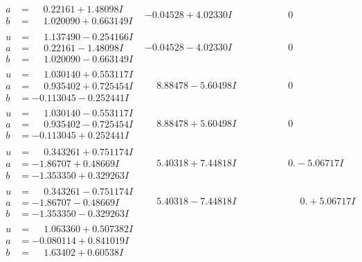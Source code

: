 \documentclass[1p]{elsarticle_modified}
\theoremstyle{definition}
\begin{document}
$$\begin{array}{c|c|c}
\begin{aligned}
a &= \phantom{-}0.22161 + 1.48098 I \\
b &= \phantom{-}1.020090 + 0.663149 I\end{aligned}
 & -0.04528 + 4.02330 I & \phantom{-0.000000 } 0 \\ \hline\begin{aligned}
u &= \phantom{-}1.137490 - 0.254166 I \\
a &= \phantom{-}0.22161 - 1.48098 I \\
b &= \phantom{-}1.020090 - 0.663149 I\end{aligned}
 & -0.04528 - 4.02330 I & \phantom{-0.000000 } 0 \\ \hline\begin{aligned}
u &= \phantom{-}1.030140 + 0.553117 I \\
a &= \phantom{-}0.935402 + 0.725454 I \\
b &= -0.113045 - 0.252441 I\end{aligned}
 & \phantom{-}8.88478 - 5.60498 I & \phantom{-0.000000 } 0 \\ \hline\begin{aligned}
u &= \phantom{-}1.030140 - 0.553117 I \\
a &= \phantom{-}0.935402 - 0.725454 I \\
b &= -0.113045 + 0.252441 I\end{aligned}
 & \phantom{-}8.88478 + 5.60498 I & \phantom{-0.000000 } 0 \\ \hline\begin{aligned}
u &= \phantom{-}0.343261 + 0.751174 I \\
a &= -1.86707 + 0.48669 I \\
b &= -1.353350 + 0.329263 I\end{aligned}
 & \phantom{-}5.40318 + 7.44818 I & \phantom{-0.000000 } 0. - 5.06717 I \\ \hline\begin{aligned}
u &= \phantom{-}0.343261 - 0.751174 I \\
a &= -1.86707 - 0.48669 I \\
b &= -1.353350 - 0.329263 I\end{aligned}
 & \phantom{-}5.40318 - 7.44818 I & \phantom{-0.000000 -}0. + 5.06717 I \\ \hline\begin{aligned}
u &= \phantom{-}1.063360 + 0.507382 I \\
a &= -0.080114 + 0.841019 I \\
b &= \phantom{-}1.63402 + 0.60538 I\end{aligned}

\end{array}$$
\end{document}
